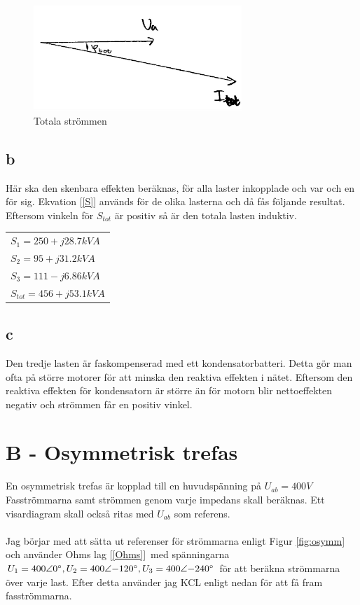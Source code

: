 \documentclass{article}
\begin{document}
  \begin{figure}[H]
  \begin{center}
  \includegraphics[width=0.7\textwidth]{img/Itot.jpg} %
  \caption{Totala strömmen}
  \end{center}
  \end{figure}

\subsection{b}
  Här ska den skenbara effekten beräknas, för alla laster inkopplade och var och en för sig.
  Ekvation [\ref{S}] används för de olika lasterna och då fås följande resultat.
  Eftersom vinkeln för $S_{tot}$ är positiv så är den totala lasten induktiv.

  \begin{tabular}{l}
      $S_1=250 + j28.7 kVA$ \\
      $S_2=95+ j31.2 kVA$ \\
      $S_3 = 111 -  j6.86 kVA$\\
      $S_{tot}=456 + j53.1 kVA$
  \end{tabular}

\subsection{c}
Den tredje lasten är faskompenserad med ett kondensatorbatteri.
Detta gör man ofta på större motorer för att minska den reaktiva effekten i nätet.
Eftersom den reaktiva effekten för kondensatorn är större än för motorn blir nettoeffekten negativ och strömmen får en positiv vinkel.


\section{B - Osymmetrisk trefas}
  En osymmetrisk trefas är kopplad till en huvudspänning på $U_{ab}=400V$
  Fasströmmarna samt strömmen genom varje impedans skall beräknas.
  Ett visardiagram skall också ritas med $U_{ab}$ som referens.
  \\
  \\
  Jag börjar med att sätta ut referenser för strömmarna enligt Figur \ref{fig:osymm} och använder Ohms lag [\ref{Ohms}]\
   med spänningarna $U_1=400\angle{0\degree},U_2=400\angle{-120\degree},U_3=400\angle{-240\degree}$ för att beräkna strömmarna över varje last.
  Efter detta använder jag KCL enligt nedan för att få fram fasströmmarna.
\end{document}
